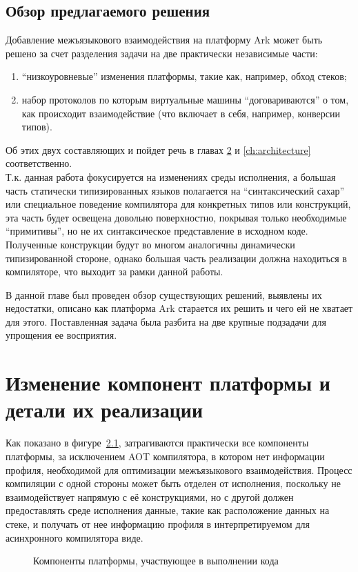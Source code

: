 \documentclass[times,specification,annotation]{itmo-student-thesis}
\begin{document}
\section{Обзор предлагаемого решения}
Добавление межъязыкового взаимодействия на платформу Ark может быть решено за счет разделения задачи на две практически независимые части:\\
\begin{enumerate}
	\item ``низкоуровневые'' изменения платформы, такие как, например, обход стеков;
	\item набор протоколов по которым виртуальные машины ``договариваются'' о том, как происходит взаимодействие (что включает в себя, например, конверсии типов).
\end{enumerate}
Об этих двух составляющих и пойдет речь в главах \ref{ch:platform} и \ref{ch:architecture} соответственно.\\
Т.к. данная работа фокусируется на изменениях среды исполнения, а большая часть статически типизированных языков полагается на ``синтаксический сахар'' или специальное поведение компилятора для конкретных типов или конструкций, эта часть будет освещена довольно поверхностно, покрывая только необходимые ``примитивы'', но не их синтаксическое представление в исходном коде. Полученные конструкции будут во многом аналогичны динамически типизированной стороне, однако большая часть реализации должна находиться в компиляторе, что выходит за рамки данной работы.

\chapterconclusion
В данной главе был проведен обзор существующих решений, выявлены их недостатки, описано как платформа Ark старается их решить и чего ей не хватает для этого. Поставленная задача была разбита на две крупные подзадачи для упрощения ее восприятия.

\chapter{Изменение компонент платформы и детали их реализации}\label{ch:platform}
Как показано в фигуре~\ref{fig:all-components}, затрагиваются практически все компоненты платформы, за исключением AOT компилятора, в котором нет информации профиля, необходимой для оптимизации межъязыкового взаимодействия. Процесс компиляции с одной стороны может быть отделен от исполнения, поскольку не взаимодействует напрямую с её конструкциями, но с другой должен предоставлять среде исполнения данные, такие как расположение данных на стеке, и получать от нее информацию профиля в интерпретируемом для асинхронного компилятора виде.
\begin{figure}[!h]
	\caption{Компоненты платформы, участвующее в выполнении кода}\label{fig:all-components}
	\centering
	
\end{figure}
\end{document}
